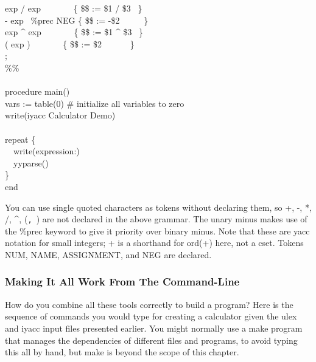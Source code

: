 {\>   {\textbar} exp {\textquotesingle}/{\textquotesingle} exp
\ \ \ \ \ \ \ \{ \$\$ := \$1 / \$3 \ \} \\
\>   {\textbar} {\textquotesingle}-{\textquotesingle} exp \ \%prec NEG
\{ \$\$ := -\$2 \ \ \ \ \ \} \\
\>   {\textbar} exp {\textquotesingle}\^{}{\textquotesingle} exp
\ \ \ \ \ \ \ \{ \$\$ := \$1 \^{} \$3 \ \} \\
\>   {\textbar} {\textquotesingle}({\textquotesingle} exp
{\textquotesingle}){\textquotesingle} \ \ \ \ \ \ \ \{ \$\$ := \$2
\ \ \ \ \ \ \} \\
\>   ; \\
\%\% \\
\ \\
procedure main() \\
\>   vars := table(0) \# initialize all variables to zero \\
\>   write({\textquotedbl}iyacc Calculator Demo{\textquotedbl}) \\
\ \\
\>   repeat \{ \\
\>   \ \ write({\textquotedbl}expression:{\textquotedbl})  \\
\>   \ \ yyparse() \\
\>   \} \\
end
}

You can use single quoted characters as tokens without declaring them,
so \textsf{{\textquotesingle}+{\textquotesingle}},
\textsf{{\textquotesingle}-{\textquotesingle}},
\textsf{{\textquotesingle}*{\textquotesingle}},
\textsf{{\textquotesingle}/{\textquotesingle}},
\textsf{{\textquotesingle}\^{}{\textquotesingle}},
\textsf{{\textquotesingle}({\textquotesingle}}\texttt{,
}\textsf{{\textquotesingle}){\textquotesingle}} are not declared in the
above grammar. The unary minus makes use of the \textsf{\%prec} keyword
to give it priority over binary minus. Note that these are
\textsf{yacc} notation for small integers;
\textsf{{\textquotesingle}+{\textquotesingle}} is a shorthand for
\textsf{ord({\textquotedbl}+{\textquotedbl})} here, not a cset. Tokens
NUM, NAME, ASSIGNMENT, and NEG are declared.

\subsubsection{Making It All Work From The Command-Line}

How do you combine all these tools correctly to build a program? Here is
the sequence of commands you would type for creating a calculator given
the ulex and iyacc input files presented earlier. You might normally
use a {\textquotedbl}make{\textquotedbl} program that manages the
dependencies of different files and programs, to avoid typing this all
by hand, but {\textquotedbl}make{\textquotedbl} is beyond the scope of
this chapter.



